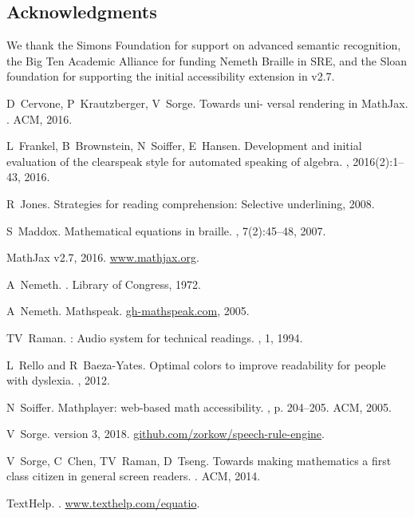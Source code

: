 \documentclass{sig-alternate}
\begin{document}
\subsection*{Acknowledgments}
We thank the Simons Foundation for support on advanced semantic recognition, the
Big Ten Academic Alliance for funding Nemeth Braille in SRE, and the
Sloan foundation for supporting the initial accessibility extension in v2.7.

% 
% 
\renewcommand{\baselinestretch}{.98}
\begin{thebibliography}{10}

D~Cervone, P~Krautzberger, V~Sorge.
\newblock Towards uni- versal rendering in MathJax.
. ACM, 2016.

L~Frankel, B~Brownstein, N~Soiffer, E~Hansen.
\newblock Development and initial evaluation of the clearspeak style for
  automated speaking of algebra.
, 2016(2):1--43, 2016.

R~Jones.
\newblock Strategies for reading comprehension: Selective underlining, 2008.

S~Maddox.
\newblock Mathematical equations in braille.
, 7(2):45--48, 2007.

{MathJax} v2.7, 2016.
\newblock \url{www.mathjax.org}.

A~Nemeth.
.
\newblock Library of Congress, 1972.

A~Nemeth.
\newblock Mathspeak.
\newblock \url{gh-mathspeak.com}, 2005.

TV~Raman.
: Audio system for technical readings.
, 1, 1994.

L~Rello and R~Baeza-Yates.
\newblock Optimal colors to improve readability for people with dyslexia.
, 2012.

N~Soiffer.
\newblock Mathplayer: web-based math accessibility.
, p. 204--205. ACM, 2005.

V~Sorge.
 version 3, 2018.
\newblock \url{github.com/zorkow/speech-rule-engine}.

V~Sorge, C~Chen, TV~Raman, D~Tseng.
\newblock Towards making mathematics a first class citizen in general screen
  readers.
. ACM, 2014.

TextHelp.
.
\newblock \url{www.texthelp.com/equatio}.

\end{thebibliography}
\end{document}
